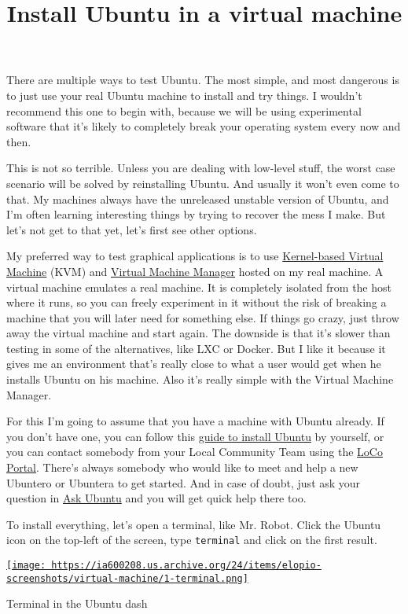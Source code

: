 \documentclass[12pt]{article}
\title{Install Ubuntu in a virtual machine}
\begin{document}
There are multiple ways to test Ubuntu. The most simple, and most dangerous is
to just use your real Ubuntu machine to install and try things. I wouldn't
recommend this one to begin with, because we will be using experimental software
that it's likely to completely break your operating system every now and then.

This is not so terrible. Unless you are dealing with low-level stuff, the worst
case scenario will be solved by reinstalling Ubuntu. And usually it won't even
come to that. My machines always have the unreleased unstable version of
Ubuntu, and I'm often learning interesting things by trying to recover the mess
I make. But let's not get to that yet, let's first see other options.

My preferred way to test graphical applications is to use
\href{https://en.wikipedia.org/wiki/Kernel-based_Virtual_Machine}
     {Kernel-based Virtual Machine} (KVM) and
\href{https://en.wikipedia.org/wiki/Virtual_Machine_Manager}
     {Virtual Machine Manager} hosted on my real machine. A virtual machine
emulates a real machine. It is completely isolated from the host where it runs,
so you can freely experiment in it without the risk of breaking a machine that
you will later need for something else. If things go crazy, just throw away the
virtual machine and start again. The downside is that it's slower than testing
in some of the alternatives, like LXC or Docker. But I like it because it gives
me an environment that's really close to what a user would get when he installs
Ubuntu on his machine. Also it's really simple with the Virtual Machine Manager.

For this I'm going to assume that you have a machine with Ubuntu already. If
you don't have one, you can follow this
\href{https://www.ubuntu.com/download/desktop/install-ubuntu-desktop}
     {guide to install Ubuntu} by yourself, or you can contact somebody from
your Local Community Team using the
\href{http://loco.ubuntu.com/}{LoCo Portal}. There's always somebody who would
like to meet and help a new Ubuntero or Ubuntera to get started. And in case
of doubt, just ask your question in \href{https://askubuntu.com/}{Ask Ubuntu}
and you will get quick help there too.

To install everything, let's open a terminal, like Mr. Robot. Click the Ubuntu
icon on the top-left of the screen, type \verb$terminal$ and click on the first
result.

\begin{center}
  \href{
    https://ia600208.us.archive.org/24/items/elopio-screenshots/virtual-machine/1-terminal.png}{
    \texttt{[image: 
    https://ia600208.us.archive.org/24/items/elopio-screenshots/virtual-machine/1-terminal.png]}
  }
  \caption{Terminal in the Ubuntu dash}
\end{center}
\end{document}
